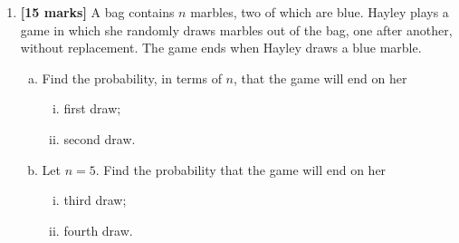 \documentclass[12pt, twoside]{article}
\begin{document}
\begin{enumerate}
\begin{enumerate}[(a)]
    \item Find the $x$-intercepts of the graph of $f$.
    \item Find the equation of the axis of symmetry of the graph of $f$.
    \item The function can be written in the form $f(x) = (x-h)^2 + k$.
    \begin{enumerate}[(i)]
        \item Write down the value of $h$.
        \item Find the value of $k$.
    \end{enumerate}
\end{enumerate}

The graph of a second function, $g$, is obtained by a reflection of the graph of $f$ in the $y$-axis, followed by a translation of $\begin{pmatrix} -3 \\ 6 \end{pmatrix}$.

\begin{enumerate}[(a)]
    \setcounter{enumii}{3}
    \item Find the coordinates of the vertex of the graph of $g$.
\end{enumerate}

\vspace{1cm}

\item \textbf{[15 marks]} A bag contains $n$ marbles, two of which are blue. Hayley plays a game in which she randomly draws marbles out of the bag, one after another, without replacement. The game ends when Hayley draws a blue marble.

\begin{enumerate}[(a)]
    \item Find the probability, in terms of $n$, that the game will end on her
    \begin{enumerate}[(i)]
        \item first draw;
        \item second draw.
    \end{enumerate}
    \item Let $n = 5$. Find the probability that the game will end on her
    \begin{enumerate}[(i)]
        \item third draw;
        \item fourth draw.
    \end{enumerate}
\end{enumerate}


\end{enumerate}
\end{document}
